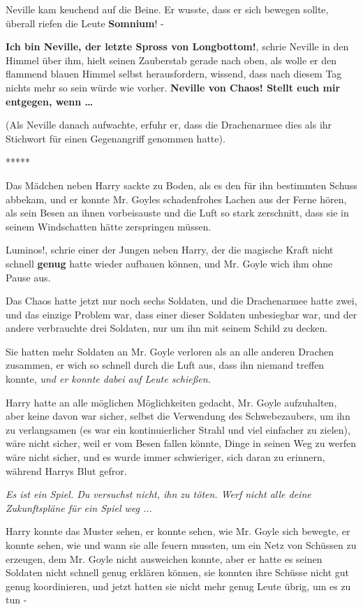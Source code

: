 Neville kam keuchend auf die Beine. Er wusste, dass er sich bewegen sollte,
überall riefen die Leute \glqq{}\textbf{Somnium}!\grqq{} -

\glqq{}\textbf{Ich bin Neville, der letzte Spross von Longbottom!}\grqq{},
schrie Neville in den Himmel über ihm, hielt seinen Zauberstab gerade nach oben,
als wolle er den flammend blauen Himmel selbst herausfordern, wissend, dass nach
diesem Tag nichts mehr so sein würde wie vorher. \glqq{}\textbf{Neville von
Chaos! Stellt euch mir entgegen, wenn …}\grqq{}

(Als Neville danach aufwachte, erfuhr er, dass die Drachenarmee dies als ihr
Stichwort für einen Gegenangriff genommen hatte).

\begin{center}*****\end{center}

Das Mädchen neben Harry sackte zu Boden, als es den für ihn bestimmten Schuss
abbekam, und er konnte Mr. Goyles schadenfrohes Lachen aus der Ferne hören, als
sein Besen an ihnen vorbeisauste und die Luft so stark zerschnitt, dass sie in
seinem Windschatten hätte zerspringen müssen.

\glqq{}Luminos!\grqq{}, schrie einer der Jungen neben Harry, der die magische
Kraft nicht schnell \textbf{genug} hatte wieder aufbauen können, und Mr. Goyle
wich ihm ohne Pause aus.

Das Chaos hatte jetzt nur noch sechs Soldaten, und die Drachenarmee hatte zwei,
und das einzige Problem war, dass einer dieser Soldaten unbesiegbar war, und der
andere verbrauchte drei Soldaten, nur um ihn mit seinem Schild zu decken.

Sie hatten mehr Soldaten an Mr. Goyle verloren als an alle anderen Drachen
zusammen, er wich so schnell durch die Luft aus, dass ihn niemand treffen
konnte, \emph{und er konnte dabei auf Leute schießen.}

Harry hatte an alle möglichen Möglichkeiten gedacht, Mr. Goyle aufzuhalten, aber
keine davon war sicher, selbst die Verwendung des Schwebezaubers, um ihn zu
verlangsamen (es war ein kontinuierlicher Strahl und viel einfacher zu zielen),
wäre nicht sicher, weil er vom Besen fallen könnte, Dinge in seinen Weg zu
werfen wäre nicht sicher, und es wurde immer schwieriger, sich daran zu
erinnern, während Harrys Blut gefror.

\emph{Es ist ein Spiel. Du versuchst nicht, ihn zu töten. Werf nicht alle deine
Zukunftspläne für ein Spiel weg ...\grqq{}}

Harry konnte das Muster sehen, er konnte sehen, wie Mr. Goyle sich bewegte, er
konnte sehen, wie und wann sie alle feuern mussten, um ein Netz von Schüssen zu
erzeugen, dem Mr. Goyle nicht ausweichen konnte, aber er hatte es seinen
Soldaten nicht schnell genug erklären können, sie konnten ihre Schüsse nicht gut
genug koordinieren, und jetzt hatten sie nicht mehr genug Leute übrig, um es zu
tun -

